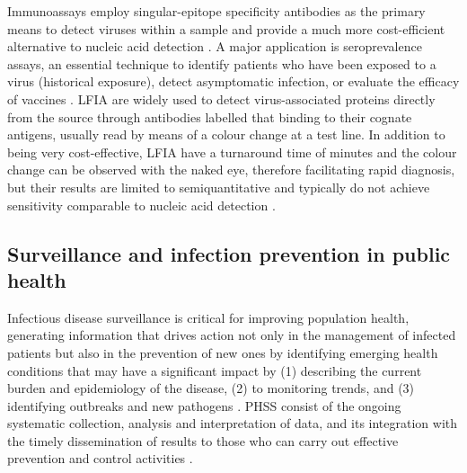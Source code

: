 Immunoassays employ singular-epitope specificity antibodies as the primary means to detect viruses within a sample and provide a much more cost-efficient alternative to nucleic acid detection \citep{cassedy_virus_2021}. 
A major application is seroprevalence assays, an essential technique to identify patients who have been exposed to a virus (historical exposure), detect asymptomatic infection, or evaluate the efficacy of vaccines \citep{chan_determining_2021, bobrovitz_global_2021}. 
\ac{LFIA} are widely used to detect virus-associated proteins directly from the source through antibodies labelled that binding to their cognate antigens, usually read by means of a colour change at a test line. 
In addition to being very cost-effective, \ac{LFIA} have a turnaround time of minutes and the colour change can be observed with the naked eye, therefore facilitating rapid diagnosis, but their results are limited to semiquantitative and typically do not achieve sensitivity comparable to nucleic acid detection \citep{estrela_lateral_2016, cassedy_virus_2021, di_nardo_ten_2021}.

\subsection{Surveillance and infection prevention in public health} \label{ssec:_intro_survaillance}

Infectious disease surveillance is critical for improving population health, generating information that drives action not only in the management of infected patients but also in the prevention of new ones by identifying emerging health conditions that may have a significant impact by (1) describing the current burden and epidemiology of the disease, (2) to monitoring trends, and (3) identifying outbreaks and new pathogens \citep{groseclose_public_2017, murray_infectious_2017}. 
\ac{PHSS} consist of the ongoing systematic collection, analysis and interpretation of data, and its integration with the timely dissemination of results to those who can carry out effective prevention and control activities \citep{teutsch_considerations_2010}. 

